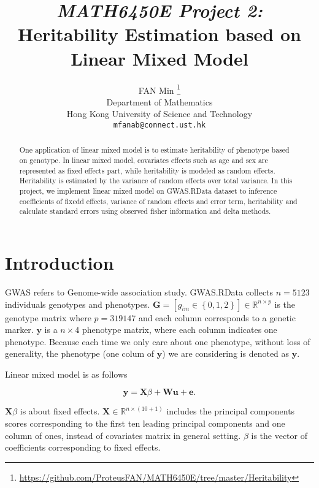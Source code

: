 \documentclass{article}
\title{\emph{MATH6450E Project 2:} Heritability Estimation based on Linear Mixed Model}
\author{%
  FAN Min
  \thanks{\url{https://github.com/ProteusFAN/MATH6450E/tree/master/Heritability}} \\
  Department of Mathematics\\
  Hong Kong University of Science and Technology\\
  \texttt{mfanab@connect.ust.hk} \\
}
\begin{document}

\maketitle

\begin{abstract}
	
	One application of linear mixed model is to estimate heritability of phenotype based on genotype. In linear mixed model, covariates effects such as age and sex are represented as fixed effects part, while heritability is modeled as random effects. Heritability is estimated by the variance of random effects over total variance. In this project, we implement linear mixed model on GWAS.RData dataset to inference coefficients of fixedd effects, variance of random effects and error term, heritability and calculate standard errors using observed fisher information and delta methods.
	
\end{abstract}

\section{Introduction}

GWAS refers to Genome-wide association study. GWAS.RData collects $ n = 5123 $ individuals genotypes and phenotypes. $ \mathbf{G} = [g_{im} \in \left\lbrace  0, 1, 2  \right\rbrace] \in \mathbb{R}^{n \times p} $ is the genotype matrix where $ p = 319147 $ and each column corresponds to a genetic marker. $ \mathbf{y} $ is a $ n \times 4 $ phenotype matrix, where each column indicates one phenotype. Because each time we only care about one phenotype, without loss of generality, the phenotype (one colum of $ \mathbf{y} $) we are considering is denoted as $ \mathbf{y} $.

Linear mixed model is as follows

\begin{equation}
	\mathbf{y} = \mathbf{X} \beta  + \mathbf{W u} + \mathbf{e}.
\end{equation}

$ \mathbf{X} \beta $ is about fixed effects. $ \mathbf{X} \in \mathbb{R}^{n \times (10 +1) } $ includes the principal components scores corresponding to the first ten leading principal components and one column of ones, instead of covariates matrix in general setting. $ \beta $ is the vector of coefficients corresponding to fixed effects.
\end{document}
